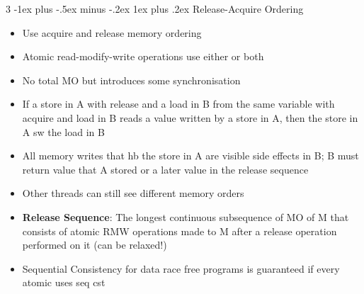 \documentclass[10pt, landscape]{article}
\makeatletter
\renewcommand{\subsection}{\@startsection{subsection}{3}{0mm}%
                                {-1ex plus -.5ex minus -.2ex}%
                                {1ex plus .2ex}%
                                {\normalfont\small\bfseries}}%
\makeatother
\begin{document}
\begin{multicols*}{3}
\subsection{Release-Acquire Ordering}
\begin{itemize}
    \item Use acquire and release memory ordering
    \item Atomic read-modify-write operations use either or both
    \item No total MO but introduces some synchronisation
    \item If a store in A with release and a load in B from the same variable with acquire and load in B reads a value written by a store in A, then the store in A sw the load in B
    \item All memory writes that hb the store in A are visible side effects in B; B must return value that A stored or a later value in the release sequence
    \item Other threads can still see different memory orders
    \item \textbf{Release Sequence}: The longest continuous subsequence of MO of M that consists of atomic RMW operations made to M after a release operation performed on it (can be relaxed!)
    \item Sequential Consistency for data race free programs is guaranteed if every atomic uses seq cst
\end{itemize}


\end{multicols*}
\end{document}
